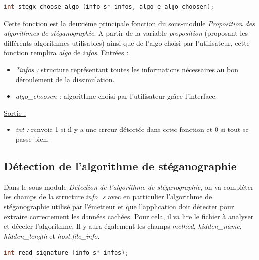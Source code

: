 \documentclass[11pt]{article}
\begin{document}
\begin{lstlisting}[language=c]
int stegx_choose_algo (info_s* infos, algo_e algo_choosen); 
\end{lstlisting}

Cette fonction est la deuxième principale fonction du sous-module 
\textit{Proposition des algorithmes de stéganographie}. 
A partir de la variable \textit{proposition} (proposant les différents 
algorithmes utilisables) ainsi que de l'algo choisi par l'utilisateur, 
cette fonction remplira \textit{algo} de \textit{infos}. 
\newline
\underline{Entrées :}
\begin{itemize}
\item \textit{*infos :} structure représentant toutes les informations 
nécessaires au bon déroulement de la dissimulation. 
\item \textit{algo\_choosen :} algorithme choisi par l'utilisateur grâce
l'interface.
\end{itemize}
\underline{Sortie :} 
\begin{itemize}
\item \textit{int :} renvoie 1 si il y a une erreur détectée dans cette 
fonction et 0 si tout se passe bien.  
\newline 
\end{itemize}

\subsection{Détection de l'algorithme de stéganographie}

Dans le sous-module \textit{Détection de l'algorithme de stéganographie}, 
on va compléter les champs de la structure \textit{info\_s} avec en particulier 
l'algorithme de stéganographie utilisé par l'émetteur et que l'application 
doit détecter pour extraire correctement les données cachées. Pour cela, 
il va lire le fichier à analyser et déceler l'algorithme. Il y aura également 
les champs \textit{method}, \textit{hidden\_name}, \textit{hidden\_length}
et \textit{host.file\_info}.\newline

\begin{lstlisting}[language=c]
int read_signature (info_s* infos); 
\end{lstlisting}
\end{document}
